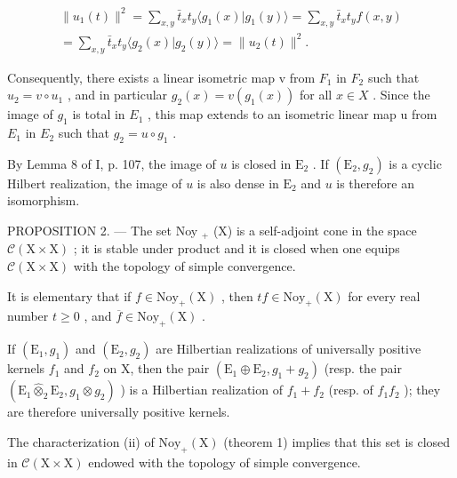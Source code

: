 \[
\begin{array}{c} \| u _ {1} (t) \| ^ {2} = \sum_ {x, y} \bar {t} _ {x} t _ {y} \langle g _ {1} (x)   |   g _ {1} (y) \rangle = \sum_ {x, y} \bar {t} _ {x} t _ {y} f (x, y) \\ = \sum_ {x, y} \bar {t} _ {x} t _ {y} \langle g _ {2} (x)   |   g _ {2} (y) \rangle = \| u _ {2} (t) \| ^ {2}. \end{array}
\]

Consequently, there exists a linear isometric map v from \(F_{1}\) in \(F_{2}\) such that \(u_{2}=v\circ u_{1}\) , and in particular \(g_{2}(x)=v(g_{1}(x))\) for all \(x\in X\) . Since the image of \(g_{1}\) is total in \(E_{1}\) , this map extends to an isometric linear map u from \(E_{1}\) in \(E_{2}\) such that \(g_{2}=u\circ g_{1}\) .

By Lemma 8 of I, p. 107, the image of \(u\) is closed in \(\mathrm{E}_2\) . If \((\mathrm{E}_2,g_2)\) is a cyclic Hilbert realization, the image of \(u\) is also dense in \(\mathrm{E}_2\) and \(u\) is therefore an isomorphism.

PROPOSITION 2. --- The set Noy \(_{+}\) (X) is a self-adjoint cone in the space \(\mathcal{C}(\text{X} \times \text{X})\) ; it is stable under product and it is closed when one equips \(\mathcal{C}(\text{X} \times \text{X})\) with the topology of simple convergence.

It is elementary that if \(f \in \mathrm{Noy}_{+}(\mathrm{X})\) , then \(tf \in \mathrm{Noy}_{+}(\mathrm{X})\) for every real number \(t \geqslant 0\) , and \(\overline{f} \in \mathrm{Noy}_{+}(\mathrm{X})\) .

If \((\mathrm{E}_{1}, g_{1})\) and \((\mathrm{E}_{2}, g_{2})\) are Hilbertian realizations of universally positive kernels \(f_{1}\) and \(f_{2}\) on X, then the pair \((\mathrm{E}_{1} \oplus \mathrm{E}_{2}, g_{1} + g_{2})\) (resp. the pair \((\mathrm{E}_{1} \widehat{\otimes}_{2} \mathrm{E}_{2}, g_{1} \otimes g_{2})\) ) is a Hilbertian realization of \(f_{1} + f_{2}\) (resp. of \(f_{1}f_{2}\) ); they are therefore universally positive kernels.

The characterization (ii) of \(\mathrm{Noy}_{+}(\mathrm{X})\) (theorem 1) implies that this set is closed in \(\mathcal{C}(\mathrm{X}\times\mathrm{X})\) endowed with the topology of simple convergence.

